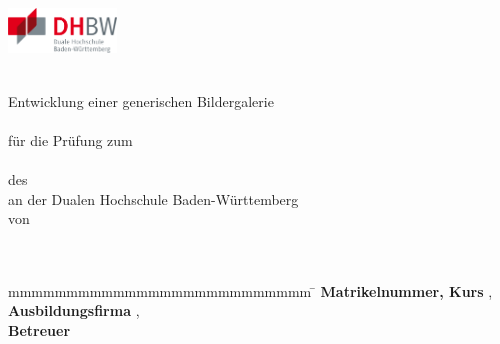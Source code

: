 

\begin{titlepage}
\BgThispage
	\hfill
	\begin{minipage}[hbt]{5cm}
	  \flushright
	  \includegraphics[height=1.2cm]{images/DHBW.pdf}
	\end{minipage}
	\enlargethispage{20mm}
	\begin{center}
	  \vspace*{12mm}	\huge \textbf{\titel}\\
	  \vspace*{2mm}   \normalsize Entwicklung einer generischen Bildergalerie\\
	  \vspace*{12mm}	{\large\bf \arbeit}\\
	  \vspace*{12mm}	\normalsize für die Prüfung zum\\
	  \vspace*{3mm} 	{\bf \abschluss}\\
	  \vspace*{12mm}	des \studiengang\\
	  \vspace*{3mm} 	an der Dualen Hochschule Baden-Württemberg \dhbw\\
	  \vspace*{12mm}	von\\
	  \vspace*{3mm} 	{\large\bf \autor}\\
	  \vspace*{12mm}	\datumAbgabe\\
	\end{center}
	\vfill
	\begin{spacing}{1.2}
	\begin{tabbing}
		mmmmmmmmmmmmmmmmmmmmmmmmmm     \= \kill
		\textbf{Matrikelnummer, Kurs}  \>  \martrikelnr, \kurs\\
		\textbf{Ausbildungsfirma}      \>  \firma, \firmenort\\
		\textbf{Betreuer}              \>  \betreuer\\
	\end{tabbing}
	\end{spacing}
\end{titlepage}